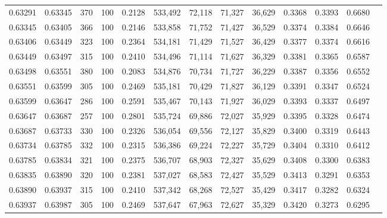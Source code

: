 \begin{tabular}{rrrrrrrrrrrrr}
0.63291 & 0.63345 &   370 & 100 &                                     0.2128 & 533,492 &  72,118 &  71,327 &  36,629 & 0.3368 & 0.3393 & 0.6680 \\
0.63345 & 0.63405 &   366 & 100 &                                     0.2146 & 533,858 &  71,752 &  71,427 &  36,529 & 0.3374 & 0.3384 & 0.6646 \\
0.63406 & 0.63449 &   323 & 100 &                                     0.2364 & 534,181 &  71,429 &  71,527 &  36,429 & 0.3377 & 0.3374 & 0.6616 \\
0.63449 & 0.63497 &   315 & 100 &                                     0.2410 & 534,496 &  71,114 &  71,627 &  36,329 & 0.3381 & 0.3365 & 0.6587 \\
0.63498 & 0.63551 &   380 & 100 &                                     0.2083 & 534,876 &  70,734 &  71,727 &  36,229 & 0.3387 & 0.3356 & 0.6552 \\
0.63551 & 0.63599 &   305 & 100 &                                     0.2469 & 535,181 &  70,429 &  71,827 &  36,129 & 0.3391 & 0.3347 & 0.6524 \\
0.63599 & 0.63647 &   286 & 100 &                                     0.2591 & 535,467 &  70,143 &  71,927 &  36,029 & 0.3393 & 0.3337 & 0.6497 \\
0.63647 & 0.63687 &   257 & 100 &                                     0.2801 & 535,724 &  69,886 &  72,027 &  35,929 & 0.3395 & 0.3328 & 0.6474 \\
0.63687 & 0.63733 &   330 & 100 &                                     0.2326 & 536,054 &  69,556 &  72,127 &  35,829 & 0.3400 & 0.3319 & 0.6443 \\
0.63734 & 0.63785 &   332 & 100 &                                     0.2315 & 536,386 &  69,224 &  72,227 &  35,729 & 0.3404 & 0.3310 & 0.6412 \\
0.63785 & 0.63834 &   321 & 100 &                                     0.2375 & 536,707 &  68,903 &  72,327 &  35,629 & 0.3408 & 0.3300 & 0.6383 \\
0.63835 & 0.63890 &   320 & 100 &                                     0.2381 & 537,027 &  68,583 &  72,427 &  35,529 & 0.3413 & 0.3291 & 0.6353 \\
0.63890 & 0.63937 &   315 & 100 &                                     0.2410 & 537,342 &  68,268 &  72,527 &  35,429 & 0.3417 & 0.3282 & 0.6324 \\
0.63937 & 0.63987 &   305 & 100 &                                     0.2469 & 537,647 &  67,963 &  72,627 &  35,329 & 0.3420 & 0.3273 & 0.6295 \\

\end{tabular}
